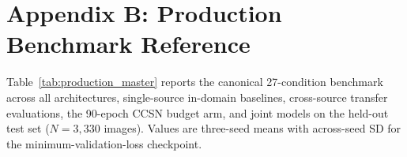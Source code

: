\documentclass[11pt,a4paper]{article}
\begin{document}
\begin{table}[!htbp]
\centering
\small
\setlength{\tabcolsep}{5pt}
\caption{Per-pool winning trials used by the single-source production configs. Validation metrics are from the per-pool tuning sweeps.}
\label{tab:per_pool_tuning_results}
\end{table}

\clearpage
\section*{Appendix B: Production Benchmark Reference}
\label{sec:appendix_master}

Table~\ref{tab:production_master} reports the canonical 27-condition benchmark across all architectures, single-source in-domain baselines, cross-source transfer evaluations, the 90-epoch CCSN budget arm, and joint models on the held-out test set ($N=3,330$ images). Values are three-seed means with across-seed SD for the minimum-validation-loss checkpoint.
\end{document}

